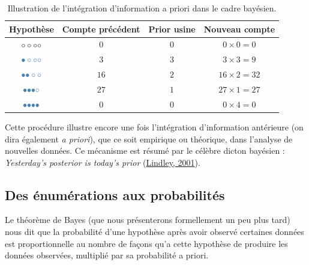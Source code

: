 \documentclass[
  a4paper,11pt,twoside,onecolumn,openright,final,oldfontcommands]{memoir}
\theoremstyle{definition}
\theoremstyle{definition}
\theoremstyle{definition}
\theoremstyle{remark}
\begin{document}
\begin{table}[!htb]

\begin{center}
\begin{threeparttable}

\caption{\label{tab:prior-table}Illustration de l'intégration d'information a priori dans le cadre bayésien.}

\begin{tabular}{cccc}
\toprule
Hypothèse & Compte précédent & Prior usine & Nouveau compte\\
\midrule
$\LARGE \circ \circ \circ \circ$ & $0$ & $0$ & $0 \times 0 = 0$\\
$\LARGE \color{steelblue}{\bullet} \circ \circ \circ$ & $3$ & $3$ & $3 \times 3 = 9$\\
$\LARGE \color{steelblue}{\bullet} \color{steelblue}{\bullet} \circ \circ$ & $16$ & $2$ & $16 \times 2 = 32$\\
$\LARGE \color{steelblue}{\bullet} \color{steelblue}{\bullet} \color{steelblue}{\bullet} \circ$ & $27$ & $1$ & $27 \times 1 = 27$\\
$\LARGE \color{steelblue}{\bullet} \color{steelblue}{\bullet} \color{steelblue}{\bullet} \color{steelblue}{\bullet}$ & $0$ & $0$ & $0 \times 4 = 0$\\
\bottomrule
\end{tabular}

\end{threeparttable}
\end{center}

\end{table}

Cette procédure illustre encore une fois l'intégration d'information antérieure (on dira également \emph{a priori}), que ce soit empirique ou théorique, dans l'analyse de nouvelles données. Ce mécanisme est résumé par le célèbre dicton bayésien : \emph{Yesterday's posterior is today's prior} (\protect\hyperlink{ref-lindley_philosophy_2001}{Lindley, 2001}).

\hypertarget{des-uxe9numuxe9rations-aux-probabilituxe9s}{%
\subsection{Des énumérations aux probabilités}\label{des-uxe9numuxe9rations-aux-probabilituxe9s}}

Le théorème de Bayes (que nous présenterons formellement un peu plus tard) nous dit que la probabilité d'une hypothèse après avoir observé certaines données est proportionnelle au nombre de façons qu'a cette hypothèse de produire les données observées, multiplié par sa probabilité a priori.
\end{document}
